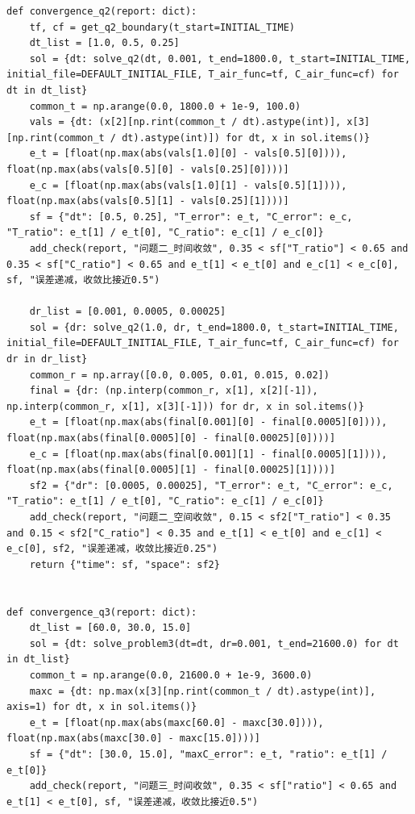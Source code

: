 \documentclass[withoutpreface,bwprint]{cumcm_thesis}
\begin{document}
\begin{appendices}
\begin{lstlisting}
def convergence_q2(report: dict):
    tf, cf = get_q2_boundary(t_start=INITIAL_TIME)
    dt_list = [1.0, 0.5, 0.25]
    sol = {dt: solve_q2(dt, 0.001, t_end=1800.0, t_start=INITIAL_TIME, initial_file=DEFAULT_INITIAL_FILE, T_air_func=tf, C_air_func=cf) for dt in dt_list}
    common_t = np.arange(0.0, 1800.0 + 1e-9, 100.0)
    vals = {dt: (x[2][np.rint(common_t / dt).astype(int)], x[3][np.rint(common_t / dt).astype(int)]) for dt, x in sol.items()}
    e_t = [float(np.max(abs(vals[1.0][0] - vals[0.5][0]))), float(np.max(abs(vals[0.5][0] - vals[0.25][0])))]
    e_c = [float(np.max(abs(vals[1.0][1] - vals[0.5][1]))), float(np.max(abs(vals[0.5][1] - vals[0.25][1])))]
    sf = {"dt": [0.5, 0.25], "T_error": e_t, "C_error": e_c, "T_ratio": e_t[1] / e_t[0], "C_ratio": e_c[1] / e_c[0]}
    add_check(report, "问题二_时间收敛", 0.35 < sf["T_ratio"] < 0.65 and 0.35 < sf["C_ratio"] < 0.65 and e_t[1] < e_t[0] and e_c[1] < e_c[0], sf, "误差递减，收敛比接近0.5")

    dr_list = [0.001, 0.0005, 0.00025]
    sol = {dr: solve_q2(1.0, dr, t_end=1800.0, t_start=INITIAL_TIME, initial_file=DEFAULT_INITIAL_FILE, T_air_func=tf, C_air_func=cf) for dr in dr_list}
    common_r = np.array([0.0, 0.005, 0.01, 0.015, 0.02])
    final = {dr: (np.interp(common_r, x[1], x[2][-1]), np.interp(common_r, x[1], x[3][-1])) for dr, x in sol.items()}
    e_t = [float(np.max(abs(final[0.001][0] - final[0.0005][0]))), float(np.max(abs(final[0.0005][0] - final[0.00025][0])))]
    e_c = [float(np.max(abs(final[0.001][1] - final[0.0005][1]))), float(np.max(abs(final[0.0005][1] - final[0.00025][1])))]
    sf2 = {"dr": [0.0005, 0.00025], "T_error": e_t, "C_error": e_c, "T_ratio": e_t[1] / e_t[0], "C_ratio": e_c[1] / e_c[0]}
    add_check(report, "问题二_空间收敛", 0.15 < sf2["T_ratio"] < 0.35 and 0.15 < sf2["C_ratio"] < 0.35 and e_t[1] < e_t[0] and e_c[1] < e_c[0], sf2, "误差递减，收敛比接近0.25")
    return {"time": sf, "space": sf2}


def convergence_q3(report: dict):
    dt_list = [60.0, 30.0, 15.0]
    sol = {dt: solve_problem3(dt=dt, dr=0.001, t_end=21600.0) for dt in dt_list}
    common_t = np.arange(0.0, 21600.0 + 1e-9, 3600.0)
    maxc = {dt: np.max(x[3][np.rint(common_t / dt).astype(int)], axis=1) for dt, x in sol.items()}
    e_t = [float(np.max(abs(maxc[60.0] - maxc[30.0]))), float(np.max(abs(maxc[30.0] - maxc[15.0])))]
    sf = {"dt": [30.0, 15.0], "maxC_error": e_t, "ratio": e_t[1] / e_t[0]}
    add_check(report, "问题三_时间收敛", 0.35 < sf["ratio"] < 0.65 and e_t[1] < e_t[0], sf, "误差递减，收敛比接近0.5")


\end{lstlisting}
\end{appendices}
\end{document}
